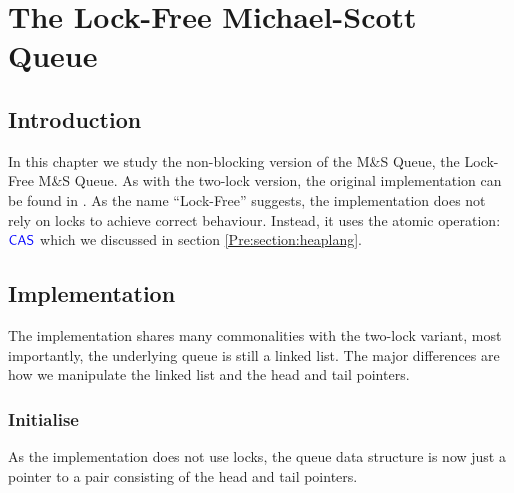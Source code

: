 \documentclass[a4paper, 10pt]{report}
\theoremstyle{definition}
\newcommand{\msq}{M\&S Queue}
\newcommand{\lfmsq}{Lock-Free \msq{}}
\begin{document}
\chapter{The Lock-Free Michael-Scott Queue}
\label{ch:LFMSQ}

\section{Introduction}
\label{LFMSQ:section:introduction}

In this chapter we study the non-blocking version of the \msq{}, the \lfmsq{}. As with the two-lock version, the original implementation can be found in \citet{DBLP:conf/podc/MichaelS96}. As the name ``Lock-Free'' suggests, the implementation does not rely on locks to achieve correct behaviour. Instead, it uses the atomic operation: $\textsf{\color{blue} CAS}$ which we discussed in section \ref{Pre:section:heaplang}.

\section{Implementation}
\label{LFMSQ:section:implementation}

The implementation shares many commonalities with the two-lock variant, most importantly, the underlying queue is still a linked list. The major differences are how we manipulate the linked list and the head and tail pointers.

\subsection{Initialise}
As the implementation does not use locks, the queue data structure is now just a pointer to a pair consisting of the head and tail pointers.
\end{document}

